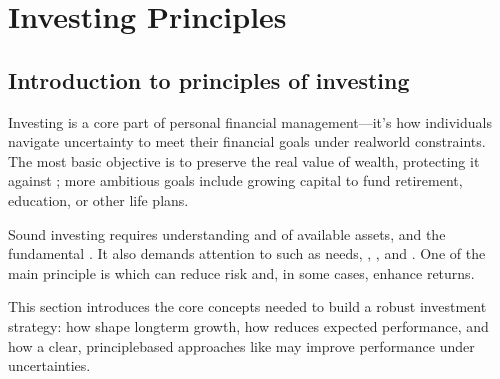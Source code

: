 \documentclass[letterpaper,10pt,english]{jupyterBook}
\begin{document}
\part{Investing Principles}

\sphinxstepscope


\chapter{Introduction to principles of investing}
\label{\detokenize{ch/principles/intro_nb:introduction-to-principles-of-investing}}\label{\detokenize{ch/principles/intro_nb:fin-edu-principles-intro-nb}}\label{\detokenize{ch/principles/intro_nb::doc}}
\sphinxAtStartPar
Investing is a core part of personal financial management—it’s how individuals navigate uncertainty to meet their financial goals under real\sphinxhyphen{}world constraints. The most basic objective is to preserve the real value of wealth, protecting it against {\hyperref[\detokenize{code/notebooks/inflation:fin-edu-inflation}]{}}; more ambitious goals include growing capital to fund retirement, education, or other life plans.

\sphinxAtStartPar
Sound investing requires understanding {\hyperref[\detokenize{ch/principles/intro_nb:fin-edu-principles-return}]{}} and {\hyperref[\detokenize{ch/principles/intro_nb:fin-edu-principles-risk}]{}} of available assets, and the fundamental {\hyperref[\detokenize{ch/principles/intro_nb:fin-edu-principles-rr}]{}}. It also demands attention to  such as  needs, , , and . One of the main principle is {\hyperref[\detokenize{ch/principles/intro_nb:fin-edu-principles-diversification}]{}} \sphinxhyphen{} which can reduce risk and, in some cases, enhance returns.

\sphinxAtStartPar
This section introduces the core concepts needed to build a robust investment strategy: how {\hyperref[\detokenize{ch/principles/intro_nb:fin-edu-principles-time-compunding}]{}} shape long\sphinxhyphen{}term growth, how {\hyperref[\detokenize{ch/principles/intro_nb:fin-edu-principles-time-volatility-drag}]{}} reduces expected performance, and how a clear, principle\sphinxhyphen{}based approaches \sphinxhyphen{} like {\hyperref[\detokenize{ch/principles/intro_nb:fin-edu-principles-rebalancing}]{}} \sphinxhyphen{} may improve performance under uncertainties.
\end{document}
